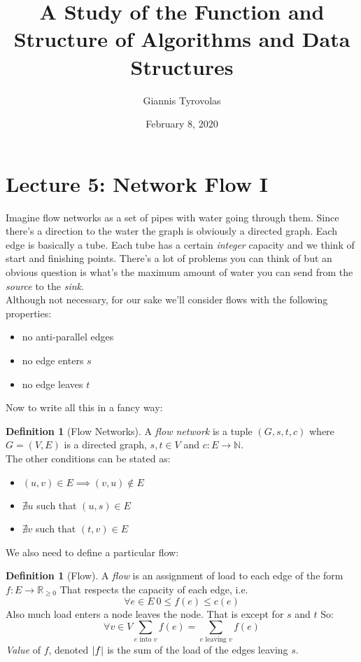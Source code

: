 \documentclass[11pt,a4paper, titlepage]{article}
\title{A Study of the Function and Structure of Algorithms and Data Structures}
\author{Giannis Tyrovolas}
\date{February 8, 2020}
\DeclarePairedDelimiter\abs{\lvert}{\rvert}
\theoremstyle{definition}
\newtheorem{definition}[theorem]{Definition}
\begin{document}
\maketitle

\section{Lecture 5: Network Flow I}

Imagine flow networks as a set of pipes with water going through them. Since there's a direction to the water the graph is obviously a directed graph. Each edge is basically a tube. Each tube has a certain \emph{integer} capacity and we think of start and finishing points. There's a lot of problems you can think of but an obvious question is what's the maximum amount of water you can send from the \emph{source} to the \emph{sink}. 
\\
Although not necessary, for our sake we'll consider flows with the following properties:
\begin{itemize}
	\item no anti-parallel edges
	\item no edge enters $s$
	\item no edge leaves $t$
\end{itemize}

Now to write all this in a fancy way:

\begin{definition}[Flow Networks]
A \emph{flow network} is a tuple $(G, s, t, c)$ where $G = (V,E)$ is a directed graph, $s, t \in V$ and $c\colon E \longrightarrow \mathbb{N}$.
\\
The other conditions can be stated as:
\begin{itemize}
	\item $(u,v) \in E \implies (v,u) \notin E$
	\item $\nexists u$ such that $(u,s) \in E$
	\item $\nexists v$ such that $(t,v) \in E$
\end{itemize}
\end{definition}

We also need to define a particular flow:

\begin{definition}[Flow]
A \emph{flow} is an assignment of load to each edge of the form $f\colon E \longrightarrow \mathbb{R}_{\geq0}$ That respects the capacity of each edge, i.e.
\[
	\forall e \in E \ 0 \leqslant f(e) \leqslant c(e)
\]
Also much load enters a node leaves the node. That is except for $s$ and $t$ So:
\[
	\forall v \in V \sum_{e \text{ into } v} f(e) = \sum_{e \text{ leaving } v} {f(e)}
\]
\emph{Value} of $f$, denoted $\abs{f}$ is the sum of the load of the edges leaving $s$.
\end{definition}
\end{document}

